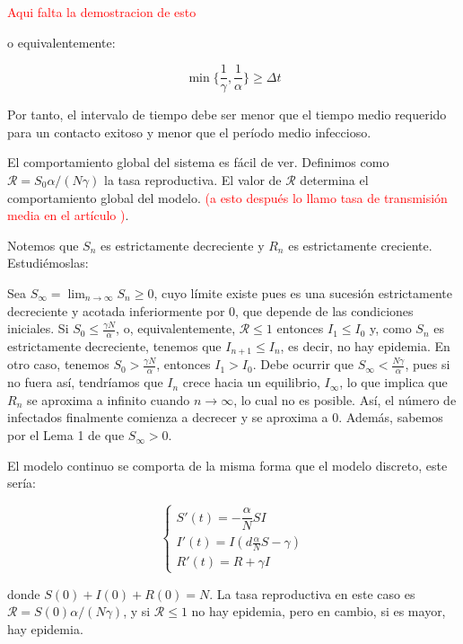\textcolor{red}{Aqui falta la demostracion de esto}

o equivalentemente:

$$\min{\bigg\{ \frac{1}{\gamma}, \frac{1}{\alpha} \bigg\} } \geq \Delta t$$

Por tanto, el intervalo de tiempo debe ser menor que el tiempo medio requerido para un contacto exitoso y menor que el período medio infeccioso.

El comportamiento global del sistema es fácil de ver. Definimos como $\mathcal{R}=S_0 \alpha/(N\gamma )$ la tasa reproductiva. El valor de $\mathcal{R}$ determina el comportamiento global del modelo. \textcolor{red}{(a esto después lo llamo tasa de transmisión media en el artículo \cite{demongeotSIEpidemicModel})}. 

Notemos que $S_n$ es estrictamente decreciente y $R_n$ es estrictamente creciente. Estudiémoslas:

Sea $S_\infty=\lim_{n\rightarrow\infty} S_n\geq 0$, cuyo límite existe pues es una sucesión estrictamente decreciente y acotada inferiormente por $0$, que depende de las condiciones iniciales. Si $S_0\leq \frac{\gamma N}{\alpha}$, o, equivalentemente, $\mathcal{R}\leq 1$ entonces $I_1\leq I_0$ y, como $S_n$ es estrictamente decreciente, tenemos que $I_{n+1}\leq I_n$, es decir, no hay epidemia. En otro caso, tenemos $S_0> \frac{\gamma N}{\alpha}$, entonces $I_1>I_0$. Debe ocurrir que $S_\infty <\frac{N\gamma}{\alpha}$, pues si no fuera así, tendríamos que $I_n$ crece hacia un equilibrio, $I_\infty$, lo que implica que $R_n$ se aproxima a infinito cuando $n\rightarrow\infty$, lo cual no es posible. Así, el número de infectados finalmente comienza a decrecer y se aproxima a $0$. Además, sabemos por el Lema 1 de \cite{allenDiscretetimeSISIR1994} que $S_\infty>0$.

El modelo continuo se comporta de la misma forma que el modelo discreto, este sería:

\begin{equation}
\label{eqn: modelo_SIR_continuo}
\begin{cases}
S'(t) = -\dfrac{\alpha}{N}SI \\
I'(t) = I\left(d\frac{\alpha}{N}S-\gamma \right) \\
R'(t) = R+\gamma I
\end{cases}
\end{equation}

donde $S(0)+I(0)+R(0)=N$. La tasa reproductiva en este caso es $\mathcal{R}=S(0)\alpha /(N\gamma )$, y si $\mathcal{R}\leq 1$  no hay epidemia, pero en cambio, si es mayor, hay epidemia.

